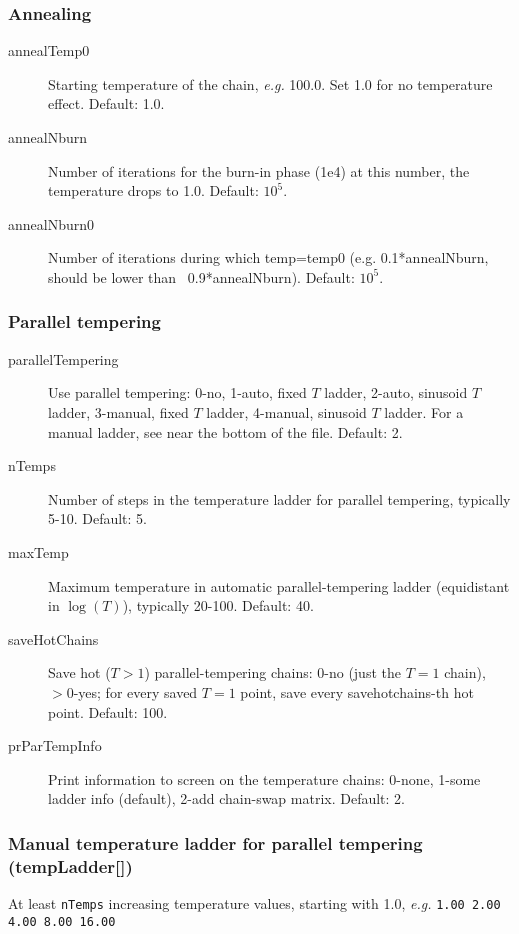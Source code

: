 \subsubsection{Annealing}
\begin{description}
\item[annealTemp0] Starting temperature of the chain, \textit{e.g.} 100.0. Set 1.0 for no temperature effect.  Default: 1.0.
\item[annealNburn] Number of iterations for the burn-in phase (1e4) at this number, the temperature drops to 1.0.  Default: $10^5$.
\item[annealNburn0] Number of iterations during which temp=temp0 (e.g. 0.1*annealNburn, should be lower than ~0.9*annealNburn).  Default: $10^5$.
\end{description}

\subsubsection{Parallel tempering}
\begin{description}
\item[parallelTempering] Use parallel tempering:  0-no,  1-auto, fixed $T$ ladder,  2-auto, sinusoid $T$ ladder,  3-manual, fixed $T$ ladder,  4-manual, sinusoid $T$ ladder.  For a manual ladder, see near the bottom of the file.  Default: 2.
\item[nTemps] Number of steps in the temperature ladder for parallel tempering, typically 5-10.  Default: 5.
\item[maxTemp] Maximum temperature in automatic parallel-tempering ladder (equidistant in $\log(T)$), typically 20-100.  Default: 40.
\item[saveHotChains] Save hot ($T>1$) parallel-tempering chains: 0-no (just the $T=1$ chain), $>0$-yes; for every saved $T=1$ point, save every savehotchains-th hot point.  Default: 100.
\item[prParTempInfo] Print information to screen on the temperature chains: 0-none, 1-some ladder info (default), 2-add chain-swap matrix.  Default: 2.
\end{description}

\subsubsection{Manual temperature ladder for parallel tempering (tempLadder[])}
At least \texttt{nTemps} increasing temperature values, starting with 1.0, \textit{e.g.} \texttt{1.00     2.00     4.00     8.00     16.00}
    





